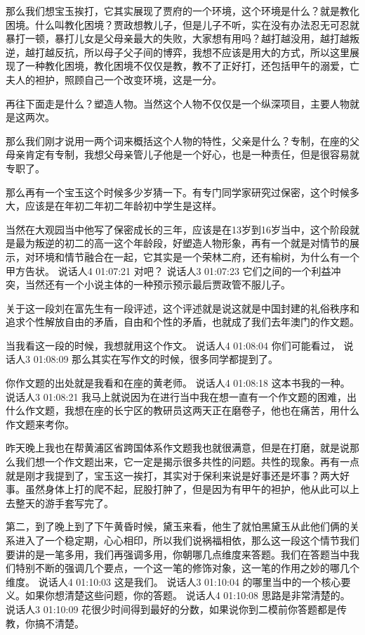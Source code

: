 \documentclass{ctexart}
\renewcommand{\\}{\par}
\begin{document}
那么我们想宝玉挨打，它其实展现了贾府的一个环境，这个环境是什么？就是教化困境。什么叫教化困境？贾政想教儿子，但是儿子不听，实在没有办法忍无可忍就暴打一顿，暴打儿女是父母亲最大的失败，大家想有用吗？越打越没用，越打越叛逆，越打越反抗，所以母子父子间的博弈，我想不应该是用大的方式，所以这里展现了一种教化困境，教化困境不仅仅是教，教不了正好打，还包括甲午的溺爱，亡夫人的袒护，照顾自己一个改变环境，这是一分。

再往下面走是什么？塑造人物。当然这个人物不仅仅是一个纵深项目，主要人物就是这两次。

那么我们刚才说用一两个词来概括这个人物的特性，父亲是什么？专制，在座的父母亲肯定有专制，我想父母亲管儿子他是一个好心，也是一种责任，但是很容易就专职了。

那么再有一个宝玉这个时候多少岁猜一下。有专门同学家研究过保密，这个时候多大，应该是在年初二年初二年龄初中学生是这样。

当然在大观园当中他写了保密成长的三年，应该是在13岁到16岁当中，这个阶段就是最为叛逆的初二的高一这个年龄段，好塑造人物形象，再有一个就是对情节的展示，对环境和情节融合在一起，它其实是一个荣林二府，还有榆树，为什么有一个甲方告状。
说话人4 01:07:21
对吧？
说话人3 01:07:23
它们之间的一个利益冲突，当然还有一个小说主体的一种预示预示最后贾政管不服儿子。

关于这一段刘在富先生有一段评述，这个评述就是说这就是中国封建的礼俗秩序和追求个性解放自由的矛盾，自由和个性的矛盾，也就成了我们去年澳门的作文题。

当我看这一段的时候，我想就用这个作文。
说话人4 01:08:04
你们可能看过，
说话人3 01:08:09
那么其实在写作文的时候，很多同学都提到了。

你作文题的出处就是我看和在座的黄老师。
说话人4 01:08:18
这本书我的一种。
说话人3 01:08:21
我马上就说因为在进行当中我在想一直有一个作文题的困难，出什么作文题，我想在座的长宁区的教研员这两天正在磨卷子，他也在痛苦，用什么作文题来考你。

昨天晚上我也在帮黄浦区省跨国体系作文题我也就很满意，但是在打磨，就是说那么我们想一个作文题出来，它一定是揭示很多共性的问题。共性的现象。再有一点就是刚才我提到了，宝玉这一挨打，其实对于保利来说是好事还是坏事？两大好事。虽然身体上打的爬不起，屁股打肿了，但是因为有甲午的袒护，他从此可以上去整天的游手套写完了。

第二，到了晚上到了下午黄昏时候，黛玉来看，他生了就怕黑黛玉从此他们俩的关系进入了一个稳定期，心心相印，所以我们说祸福相依，那么这一段这个情节我们要讲的是一笔多用，我们再强调多用，你朝哪几点维度来答题。我们在答题当中我们特别不断的强调几个要点，一个这一笔的修饰对象，这一笔的作用之妙的哪几个维度。
说话人4 01:10:03
这是我们。
说话人3 01:10:04
的哪里当中的一个核心要义。如果你想清楚这些问题，你的答题。
说话人4 01:10:08
思路是非常清楚的。
说话人3 01:10:09
花很少时间得到最好的分数，如果说你到二模前你答题都是传教，你搞不清楚。
\end{document}
